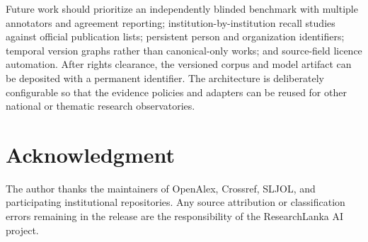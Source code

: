 \documentclass[conference]{IEEEtran}
\begin{document}
Future work should prioritize an independently blinded benchmark with multiple annotators and agreement reporting; institution-by-institution recall studies against official publication lists; persistent person and organization identifiers; temporal version graphs rather than canonical-only works; and source-field licence automation. After rights clearance, the versioned corpus and model artifact can be deposited with a permanent identifier. The architecture is deliberately configurable so that the evidence policies and adapters can be reused for other national or thematic research observatories.

\section*{Acknowledgment}
The author thanks the maintainers of OpenAlex, Crossref, SLJOL, and participating institutional repositories. Any source attribution or classification errors remaining in the release are the responsibility of the ResearchLanka AI project.



\end{document}
